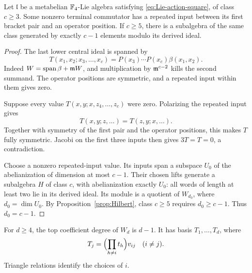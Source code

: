 \begin{lemma}\label{lem:terminal-repeat}
Let \(\mathfrak l\) be a metabelian \(\mathbb F_4\)-Lie algebra satisfying
\eqref{eq:Lie-action-square}, of class \(c\ge3\).
Some nonzero terminal commutator has a repeated input between its first
bracket pair and an operator position. If \(c\ge5\), there is a
subalgebra of the same class generated by exactly \(c-1\) elements
modulo its derived ideal.
\end{lemma}
\begin{proof}
The last lower central ideal is spanned by
\[
 T(x_1,x_2;x_3,\ldots,x_c)
     =P(x_3)\cdots P(x_c)\beta(x_1,x_2).
\]
Indeed \(W=\operatorname{span}\beta+\mathfrak m W\), and multiplication by \(\mathfrak m^{c-2}\)
kills the second summand. The operator positions are symmetric, and a
repeated input within them gives zero.

Suppose every value \(T(x,y;x,z_4,\ldots,z_c)\) were zero.
Polarizing the repeated input gives
\[
 T(x,y;z,\ldots)=T(z,y;x,\ldots).
\]
Together with symmetry of the first pair and the operator positions,
this makes \(T\) fully symmetric. Jacobi on the first three inputs
then gives \(3T=T=0\), a contradiction.

Choose a nonzero repeated-input value. Its inputs span a subspace
\(U_0\) of the abelianization of dimension at most \(c-1\).
Their chosen lifts generate a subalgebra \(H\) of class \(c\), with
abelianization exactly \(U_0\): all words of length at least two lie
in its derived ideal. Its module is a quotient of \(W_{d_0}\), where
\(d_0=\dim U_0\).
By Proposition~\ref{prop:Hilbert}, class \(c\ge5\) requires
\(d_0\ge c-1\). Thus \(d_0=c-1\).
\end{proof}

For \(d\ge4\), the top coefficient degree of \(W_d\) is \(d-1\).
It has basis \(T_1,\ldots,T_d\), where
\begin{equation}\label{eq:terminal-basis}
 T_j=\Bigl(\prod_{h\ne i}t_h\Bigr)v_{ij}\quad(i\ne j).
\end{equation}
Triangle relations identify the choices of \(i\).

